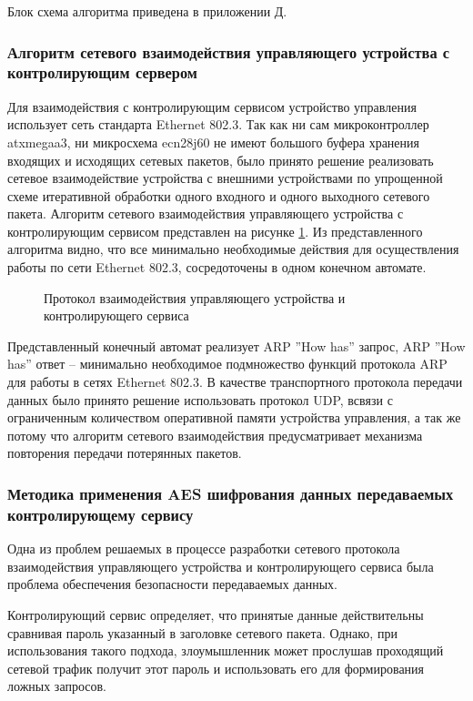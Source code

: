 Блок схема алгоритма приведена в приложении Д.


\subsubsection{Алгоритм сетевого взаимодействия управляющего устройства
с контролирующим сервером}
Для взаимодействия с контролирующим сервисом устройство управления использует сеть
стандарта Ethernet 802.3. Так как ни сам микроконтроллер at\-x\-mega\-a3, ни микросхема
ecn28j60 не имеют большого буфера хранения входящих и исходящих сетевых пакетов,
было принято решение реализовать сетевое взаимодействие устройства с внешними устройствами
по упрощенной схеме итеративной обработки одного входного и одного выходного сетевого
пакета. Алгоритм сетевого взаимодействия управляющего устройства с контролирующим сервисом представлен
на рисунке \ref{img:devProto}. Из представленного алгоритма видно, что все минимально необходимые
действия для осуществления работы по сети Ethernet 802.3, сосредоточены в одном конечном автомате.

\begin{figure}[ht]
	\caption{Протокол взаимодействия управляющего устройства и контролирующего сервиса}
	\label{img:devProto}
\end{figure}

Представленный конечный автомат реализует ARP ''How has'' запрос, ARP ''How has'' ответ --
минимально необходимое подмножество функций протокола ARP для работы в сетях Ethernet 802.3.
В качестве транспортного протокола передачи данных было принято решение использовать
протокол UDP, всвязи с ограниченным количеством оперативной памяти устройства управления, а так же
потому что алгоритм сетевого взаимодействия  предусматривает механизма повторения передачи
потерянных пакетов.


\subsubsection{Методика применения AES шифрования данных передаваемых
контролирующему сервису}
Одна из проблем решаемых в процессе разработки сетевого протокола 
взаимодействия управляющего устройства и контролирующего сервиса
была проблема обеспечения безопасности передаваемых данных.


Контролирующий сервис определяет, что принятые данные действительны
сравнивая пароль указанный в заголовке сетевого пакета. Однако,
при использования такого подхода, злоумышленник может прослушав
проходящий сетевой трафик получит этот пароль и использовать его
для формирования ложных запросов.


